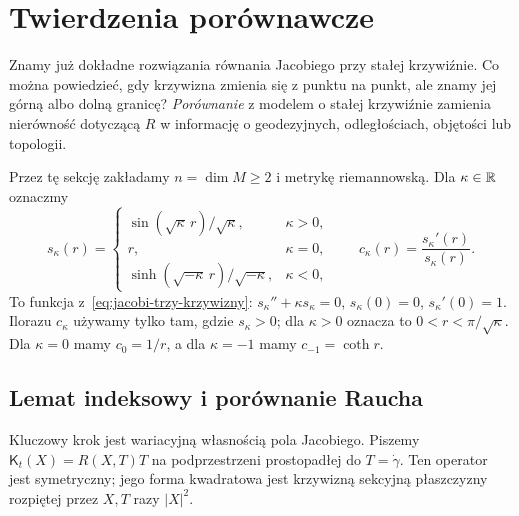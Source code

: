 \section{Twierdzenia porównawcze}
\label{sec:twierdzenia-porownawcze}

Znamy już dokładne rozwiązania równania Jacobiego
przy stałej krzywiźnie. Co można powiedzieć, gdy
krzywizna zmienia się z punktu na punkt, ale znamy
jej górną albo dolną granicę? \emph{Porównanie}
z modelem o stałej krzywiźnie zamienia nierówność
dotyczącą $R$ w informację o geodezyjnych,
odległościach, objętości lub topologii.

Przez tę sekcję zakładamy $n=\dim M\geq2$
i metrykę riemannowską. Dla $\kappa\in\mathbb{R}$
oznaczmy
\begin{equation}\label{eq:porownanie-s-kappa}
 s_\kappa(r)=
 \begin{cases}
  \sin(\sqrt\kappa\,r)/\sqrt\kappa,&\kappa>0,\\
  r,&\kappa=0,\\
  \sinh(\sqrt{-\kappa}\,r)/\sqrt{-\kappa},&\kappa<0,
 \end{cases}
 \qquad c_\kappa(r)=\frac{s_\kappa'(r)}{s_\kappa(r)}.
\end{equation}
To funkcja z~\eqref{eq:jacobi-trzy-krzywizny}:
$s_\kappa''+\kappa s_\kappa=0$,
$s_\kappa(0)=0$, $s_\kappa'(0)=1$.
Ilorazu $c_\kappa$ używamy tylko tam, gdzie
$s_\kappa>0$; dla $\kappa>0$ oznacza to
$0<r<\pi/\sqrt\kappa$. Dla $\kappa=0$
mamy $c_0=1/r$, a dla $\kappa=-1$
mamy $c_{-1}=\coth r$.

\subsection*{Lemat indeksowy i porównanie Raucha}

Kluczowy krok jest wariacyjną własnością pola
Jacobiego. Piszemy $\mathsf K_t(X)=R(X,T)T$
na podprzestrzeni prostopadłej do $T=\dot\gamma$.
Ten operator jest symetryczny; jego forma
kwadratowa jest krzywizną sekcyjną płaszczyzny
rozpiętej przez $X,T$ razy $|X|^2$.

